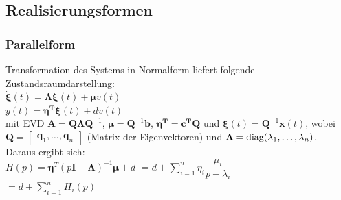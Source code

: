 \documentclass[a4paper,landscape,6pt]{article}
\newcommand{\ma}[1]{\ensuremath{\boldsymbol {#1}}}								%
\newcommand{\mat}[1]{\ensuremath{\begin{bmatrix} #1 \end{bmatrix}}}				%
\renewcommand{\vec}[1]{\ensuremath{\boldsymbol {#1}}}							%
\begin{document}
\begin{multicols}{3}
\subsection*{Realisierungsformen}
\subsubsection*{Parallelform}

Transformation des Systems in Normalform liefert folgende Zustandsraumdarstellung:\\
$ \dot{\vec \xi}(t) = \ma \Lambda \vec \xi(t) + \vec \mu v(t) $\\
$ y(t) = \vec \eta^{\ma T} \vec \xi(t) + d v(t)$ \\

mit EVD $\ma A = \ma Q \ma \Lambda \ma Q ^{-1}$, $\vec \mu = \ma Q ^{-1} \vec b$, $\vec \eta^{\ma T} = \vec c ^{\ma T} \ma Q$ und $\vec \xi(t) = \ma Q ^{-1} \vec x(t)$, wobei $\ma Q = \mat{\vec q_1, \dots, \vec q_n}$ (Matrix der Eigenvektoren) und $\ma \Lambda = \textmd{diag}(\lambda_1,\dots,\lambda_n)$.\\


Daraus ergibt sich:\\
$H(p) = \vec \eta^T (p\ma{I} - \ma{\Lambda})^{-1} \vec \mu + d$
$ = d +\sum\limits_{i=1}^{n}\eta_i \dfrac{\mu_i}{p-\lambda_i}$\\
$ = d + \sum\limits_{i=1}^{n} H_i(p)$\\


\end{multicols}
\end{document}
